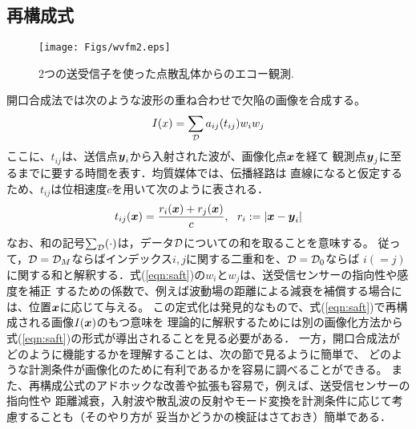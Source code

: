 \documentclass[10pt,a4j,dvipdfmx]{jarticle}
\begin{document}
\subsection{再構成式}
\begin{figure}[h]
	\begin{center}
	\texttt{[image: Figs/wvfm2.eps]} 
	\end{center}
	\caption{2つの送受信子を使った点散乱体からのエコー観測.} 
	\label{fig:wvfm2}
\end{figure}
開口合成法では次のような波形の重ね合わせで欠陥の画像を合成する。
\begin{equation}
	I(x)=\sum_{\cal D}a_{ij}(t_{ij})w_iw_j
	\label{eqn:saft}
\end{equation}
ここに、$t_{ij}$は、送信点$\mbox{\boldmath $y$}_i$から入射された波が、画像化点$\mbox{\boldmath $x$}$を経て
観測点$\mbox{\boldmath $y$}_j$に至るまでに要する時間を表す．均質媒体では、伝播経路は
直線になると仮定するため、$t_{ij}$は位相速度$c$を用いて次のように表される．
\begin{equation}
	t_{ij}(\mbox{\boldmath $x$})=\frac{r_i(\mbox{\boldmath $x$})+r_j(\mbox{\boldmath $x$})}{c}, \ \ r_i:=\left| \mbox{\boldmath $x$} -\mbox{\boldmath $y$}_i\right|
	\label{eqn:tij}
\end{equation}
なお、和の記号$\sum_{\cal D}(\cdot)$は，データ$\cal D$についての和を取ることを意味する。
従って，${\cal D}= {\cal D}_M$ならばインデックス$i,j$に関する二重和を、${\cal D} ={\cal D}_0$ならば
$i(=j)$に関する和と解釈する．式(\ref{eqn:saft})の$w_i$と$w_j$は、送受信センサーの指向性や感度を補正
するための係数で、例えば波動場の距離による減衰を補償する場合には、位置$\mbox{\boldmath $x$}$に応じて与える。
この定式化は発見的なもので、式(\ref{eqn:saft})で再構成される画像$I(\mbox{\boldmath $x$})$のもつ意味を
理論的に解釈するためには別の画像化方法から式(\ref{eqn:saft})の形式が導出されることを見る必要がある．
一方，開口合成法がどのように機能するかを理解することは、次の節で見るように簡単で、
どのような計測条件が画像化のために有利であるかを容易に調べることができる。
また、再構成公式のアドホックな改善や拡張も容易で，例えば、送受信センサーの指向性や
距離減衰，入射波や散乱波の反射やモード変換を計測条件に応じて考慮することも（そのやり方が
妥当かどうかの検証はさておき）簡単である．
\end{document}
